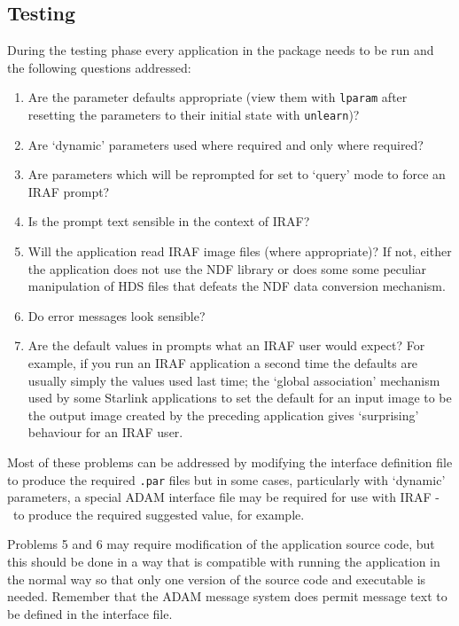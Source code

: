 \documentclass[twoside,11pt]{article}
\newcommand{\htmlref}[2]{#1}
\newcommand{\xlabel}[1]{}
\newcommand{\dash}{--}
\renewcommand{\dash}{-}
\begin{document}
\subsection{\xlabel{testing}Testing}

During the testing phase every application in the package needs to be run
and the following questions addressed:

\begin{enumerate}

\item \label{pardefs}Are the parameter defaults appropriate 
(view them with \texttt{lparam}
after resetting the parameters to their initial state with \texttt{unlearn})?

\item \label{dynamic} Are
\htmlref{`dynamic' parameters}{dynamic_parameters}
used where required and only where required?

\item \label{repeated} Are parameters which will be reprompted for set to 
`query' mode to force an IRAF prompt?

\item \label{prompt}Is the prompt text sensible in the context of IRAF?

\item \label{images}Will the application read IRAF image files 
(where appropriate)? If not,
either the application does not use the NDF library or does some some
peculiar manipulation of HDS files that defeats the NDF data conversion 
mechanism.

\item \label{error}Do error messages look sensible?

\item \label{promptdefs}Are the default values in prompts what 
an IRAF user would expect? 
For example, if you run an IRAF application a second time the defaults are
usually simply the values used last time; the `global association' mechanism
used by some Starlink applications to set the default for an input image to be
the output image created by the preceding application gives `surprising'
behaviour for an IRAF user.

\end{enumerate}

Most of these problems can be addressed by modifying the interface definition
file to produce the required \texttt{.par} files but in some cases, particularly
with `dynamic' parameters, a special ADAM interface file may be required for
use with IRAF \dash\ to produce the required suggested value, for example.

Problems 5 and 6 may require modification of the application 
source code, but this should be done in a way that is compatible with running
the application in the normal way so that only one version of the source
code and executable is needed.  Remember that the ADAM message system does
permit message text to be defined in the interface file.
\end{document}
